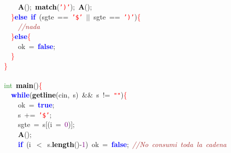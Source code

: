 {{\mbox{}\ \ \ \ \textbf{\textcolor{Black}{A}}\textcolor{BrickRed}{();}\ \textbf{\textcolor{Black}{match}}\textcolor{BrickRed}{(}\texttt{\textcolor{Red}{')'}}\textcolor{BrickRed}{);}\ \textbf{\textcolor{Black}{A}}\textcolor{BrickRed}{();} \\
\mbox{}\ \ \textcolor{Red}{\}}\textbf{\textcolor{Blue}{else}}\ \textbf{\textcolor{Blue}{if}}\ \textcolor{BrickRed}{(}sgte\ \textcolor{BrickRed}{==}\ \texttt{\textcolor{Red}{'\$'}}\ \textcolor{BrickRed}{$|$$|$}\ sgte\ \textcolor{BrickRed}{==}\ \texttt{\textcolor{Red}{')'}}\textcolor{BrickRed}{)}\textcolor{Red}{\{} \\
\mbox{}\ \ \ \ \textit{\textcolor{Brown}{//nada}} \\
\mbox{}\ \ \textcolor{Red}{\}}\textbf{\textcolor{Blue}{else}}\textcolor{Red}{\{} \\
\mbox{}\ \ \ \ ok\ \textcolor{BrickRed}{=}\ \textbf{\textcolor{Blue}{false}}\textcolor{BrickRed}{;} \\
\mbox{}\ \ \textcolor{Red}{\}} \\
\mbox{}\textcolor{Red}{\}} \\
\mbox{} \\
\mbox{}\textcolor{ForestGreen}{int}\ \textbf{\textcolor{Black}{main}}\textcolor{BrickRed}{()}\textcolor{Red}{\{} \\
\mbox{}\ \ \textbf{\textcolor{Blue}{while}}\textcolor{BrickRed}{(}\textbf{\textcolor{Black}{getline}}\textcolor{BrickRed}{(}cin\textcolor{BrickRed}{,}\ s\textcolor{BrickRed}{)}\ \textcolor{BrickRed}{\&\&}\ s\ \textcolor{BrickRed}{!=}\ \texttt{\textcolor{Red}{"{}"{}}}\textcolor{BrickRed}{)}\textcolor{Red}{\{} \\
\mbox{}\ \ \ \ ok\ \textcolor{BrickRed}{=}\ \textbf{\textcolor{Blue}{true}}\textcolor{BrickRed}{;} \\
\mbox{}\ \ \ \ s\ \textcolor{BrickRed}{+=}\ \texttt{\textcolor{Red}{'\$'}}\textcolor{BrickRed}{;} \\
\mbox{}\ \ \ \ sgte\ \textcolor{BrickRed}{=}\ s\textcolor{BrickRed}{[(}i\ \textcolor{BrickRed}{=}\ \textcolor{Purple}{0}\textcolor{BrickRed}{)];} \\
\mbox{}\ \ \ \ \textbf{\textcolor{Black}{A}}\textcolor{BrickRed}{();} \\
\mbox{}\ \ \ \ \textbf{\textcolor{Blue}{if}}\ \textcolor{BrickRed}{(}i\ \textcolor{BrickRed}{$<$}\ s\textcolor{BrickRed}{.}\textbf{\textcolor{Black}{length}}\textcolor{BrickRed}{()-}\textcolor{Purple}{1}\textcolor{BrickRed}{)}\ ok\ \textcolor{BrickRed}{=}\ \textbf{\textcolor{Blue}{false}}\textcolor{BrickRed}{;}\ \textit{\textcolor{Brown}{//No\ consumi\ toda\ la\ cadena}} \\
}}
